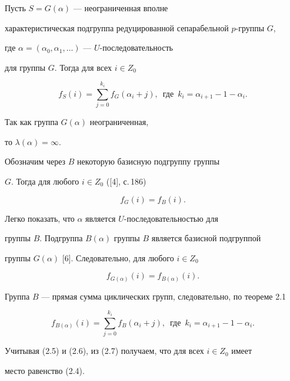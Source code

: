 \begin{thms}


Пусть $S=G(\alpha)$ --- неограниченная вполне


характеристическая подгруппа редуцированной сепарабельной $p$-группы $G$,


где $\alpha=(\alpha_0,\alpha_1,\dotsc)$ --- $U$-последовательность


для группы $G$. Тогда для всех $i\in Z_0$


\begin{equation}


f_S(i)=\sum\limits_{j=0}^{k_i}f_G(\alpha_i+j),\ \; \text{где}\ \;


k_i=\alpha_{i+1}-1-\alpha_i.


\end{equation}


\end{thms}





\begin{pf}


Так как группа $G(\alpha)$ неограниченная,


то $\lambda(\alpha)=\infty$.





Обозначим через $B$ некоторую базисную подгруппу группы


$G$. Тогда для любого $i\in Z_0$ ([4], с.\,186)


\begin{equation}


f_G(i)=f_B(i).


\end{equation}


Легко показать, что $\alpha$ является $U$-последовательностью для


группы $B$. Подгруппа $B(\alpha)$ группы $B$ является базисной подгруппой


группы $G(\alpha)$ [6]. Следовательно, для любого $i\in Z_0$


\begin{equation}


f_{G(\alpha)}(i)=f_{B(\alpha)}(i).


\end{equation}





Группа $B$ --- прямая сумма циклических групп, следовательно, по теореме 2.1


\begin{equation}


f_{B(\alpha)}(i)=\sum\limits_{j=0}^{k_i}f_B(\alpha_i+j),\ \; \text{где}\ \;


k_i=\alpha_{i+1}-1-\alpha_i.


\end{equation}


Учитывая (2.5) и (2.6), из (2.7) получаем, что для всех $i\in Z_0$ имеет


место равенство (2.4).


\end{pf}





